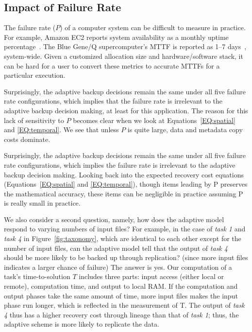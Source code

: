 \documentclass{sig-alternate}
\newcommand{\iannote}[1]{ {\textcolor{red}    { ***Ian:      #1 }}}
\newcommand{\zhaonote}[1]{{\textcolor{cyan}    { ***Zhao:      #1 }}}
\newcommand{\iannote}[1]{}
\newcommand{\zhaonote}[1]{}
\begin{document}
\subsection{Impact of Failure Rate}
\label{sec:Perf:Failure}
The failure rate ($P$) of a computer system can be difficult to measure in practice.
For example, Amazon EC2 reports  system availability as a monthly uptime percentage~\cite{AWS-SLA}.
The Blue Gene/Q supercomputer's MTTF is reported as 1--7 days~\cite{Snir-resilience}, system-wide.
Given a customized allocation size
and hardware/software stack, it can be hard for a user to convert these metrics to accurate MTTFs for a particular execution.

Surprisingly, the adaptive backup decisions remain the same under all five failure rate configurations, which implies that the failure rate is irrelevant to the adaptive backup decision making, at least for this application.
The reason for this lack of sensitivity to $P$ becomes clear when we look at Equations~\ref{EQ:spatial} and \ref{EQ:temporal}.
We see that unless $P$ is quite large, data and metadata copy costs dominate.

Surprisingly, the adaptive backup decisions remain the same under all five failure rate configurations, which implies the failure rate is irrelevant to the adaptive backup decision making. Looking back into the expected recovery cost equations (Equations~\ref{EQ:spatial} and \ref{EQ:temporal}), though items leading by P preserves the mathematical accuracy, these items can be negligible in practice assuming P is really small in practice.

We also consider a second question, namely, how does the adaptive model respond to varying numbers of input files?
For example, in the case of {\em task 1} and {\em task 4} in Figure~\ref{fig:taxonomy}, which are identical to each other except for the number of input files, can the adaptive model tell that the output of {\em task 4} should be more likely to be backed up through replication? (since more input files indicates a larger chance of failure)
The answer is yes.
Our computation of a task's time-to-solution $T$ includes three parts: input access (either local or remote), computation time, and output to local RAM. If the computation and output phases take the same amount of time, more input files makes the input phase run longer, which is reflected in the measurement of T. The output of {\em task 4} thus has a higher recovery cost through lineage than that of {\em task 1}; thus, the adaptive scheme is more likely to replicate the data.
\end{document}
